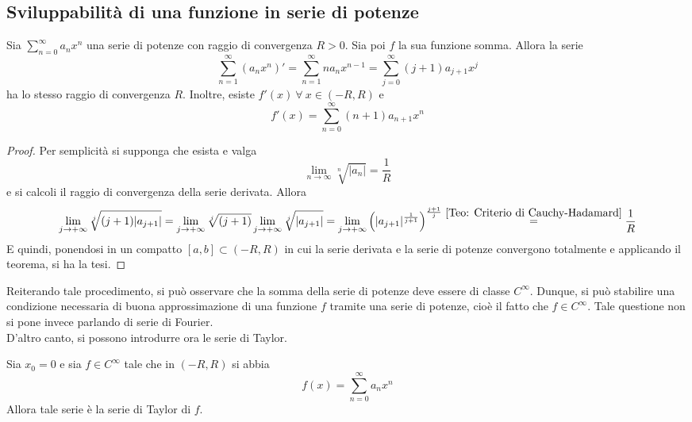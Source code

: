 \subsection{Sviluppabilità di una funzione in serie di potenze}
\begin{theorem} \label{Teo: Derivazione di serie di potenze}
Sia $\sum\limits_{n=0}^{\infty}{a_n x^n}$ una serie di potenze con raggio di convergenza $R>0$. Sia poi $f$ la sua funzione somma. Allora la serie
\begin{equation}
    \sum\limits_{n=1}^{\infty}{\left(a_n x^n\right)'}= \sum\limits_{n=1}^{\infty}{n a_n x^{n-1}}= \sum\limits_{j=0}^{\infty}{\left(j+1\right)a_{j+1} x^j}
\end{equation}
ha lo stesso raggio di convergenza $R$. Inoltre, esiste $f'(x)\ \forall\ x \in (-R, R)$ e
\begin{equation}
    f'(x)=\sum\limits_{n=0}^{\infty}{\left(n+1\right)a_{n+1} x^n}
\end{equation}
\end{theorem}
\begin{proof}
    Per semplicità si supponga che esista e valga 
    \begin{equation}
        \lim_{n \to \infty}{\sqrt[n]{|a_n|}}=\frac{1}{R}
    \end{equation}
    e si calcoli il raggio di convergenza della serie derivata. Allora
    \begin{equation}
        \lim_{j \to + \infty}{\sqrt[j]{(j+1)|a_{j+1}|}} = \lim_{j \to + \infty}{\sqrt[j]{(j+1)}} \lim_{j \to + \infty}{\sqrt[j]{|a_{j+1}|}}= \lim_{j \to + \infty}{{\left(|a_{j+1}|^{\frac{1}{j+1}}\right)^{\frac{j+1}{j}}}}  \overset{\ref{Teo: Criterio di Cauchy-Hadamard}}{=} \frac{1}{R}
    \end{equation}
    E quindi, ponendosi in un compatto $[a,b] \subset (-R, R)$ in cui la serie derivata e la serie di potenze convergono totalmente e applicando il teorema, si ha la tesi.
\end{proof}
Reiterando tale procedimento, si può osservare che la somma della serie di potenze deve essere di classe $C^\infty$. Dunque, si può stabilire una condizione necessaria di buona approssimazione di una funzione $f$ tramite una serie di potenze, cioè il fatto che $f \in C^{\infty}$. Tale questione non si pone invece parlando di serie di Fourier.\\
D'altro canto, si possono introdurre ora le serie di Taylor. 
\begin{proposition}
Sia $x_0=0$ e sia $f \in C^\infty$ tale che in $(-R, R)$ si abbia
\begin{equation}
    f(x)= \sum\limits_{n=0}^{\infty}{a_n x^n}
\end{equation}
Allora tale serie è la serie di Taylor di $f$.
\end{proposition}
